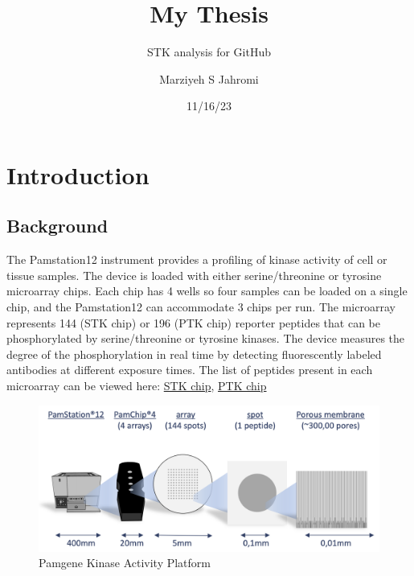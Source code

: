 \documentclass[
  letterpaper,
  DIV=11,
  numbers=noendperiod]{scrreport}
\title{My Thesis}
\subtitle{STK analysis for GitHub}
\author{Marziyeh S Jahromi}
\date{11/16/23}
\renewcommand*\contentsname{Table of contents}
\newcommand\contentsname{Table of contents}
\begin{document}
\maketitle
\ifdefined\Shaded\renewenvironment{Shaded}{\begin{tcolorbox}[breakable, boxrule=0pt, enhanced, interior hidden, borderline west={3pt}{0pt}{shadecolor}, sharp corners, frame hidden]}{\end{tcolorbox}}\fi

\renewcommand*\contentsname{Table of contents}
{
\hypersetup{linkcolor=}
\setcounter{tocdepth}{2}
\tableofcontents
}
\hypertarget{introduction}{%
\chapter{Introduction}\label{introduction}}

\hypertarget{background}{%
\section{Background}\label{background}}

The Pamstation12 instrument provides a profiling of kinase activity of
cell or tissue samples. The device is loaded with either
serine/threonine or tyrosine microarray chips. Each chip has 4 wells so
four samples can be loaded on a single chip, and the Pamstation12 can
accommodate 3 chips per run. The microarray represents 144 (STK chip) or
196 (PTK chip) reporter peptides that can be phosphorylated by
serine/threonine or tyrosine kinases. The device measures the degree of
the phosphorylation in real time by detecting fluorescently labeled
antibodies at different exposure times. The list of peptides present in
each microarray can be viewed here:
\href{https://pamgene.com/wp-content/uploads/2020/09/STK-144-PamChip-87102.pdf}{STK
chip},
\href{https://pamgene.com/wp-content/uploads/2020/09/PTK-196-PamChip-86402.pdf}{PTK
chip}

\newpage

\begin{figure}[htbp]

{\centering \includegraphics{images/pamgene_workflow.png}

}

\caption{Pamgene Kinase Activity Platform}

\end{figure}
\end{document}
